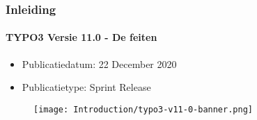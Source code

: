 %

\begin{frame}[fragile]
	\frametitle{Inleiding}
	\framesubtitle{TYPO3 Versie 11.0 - De feiten}

	\begin{itemize}
		\item Publicatiedatum: 22 December 2020
		\item Publicatietype: Sprint Release
	\end{itemize}

	\begin{figure}
		\texttt{[image: Introduction/typo3-v11-0-banner.png]}
	\end{figure}

\end{frame}

